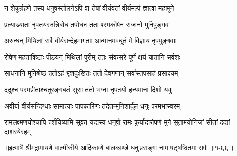 \twolineshloka
{न शेकुर्ग्रहणे तस्य धनुषस्तोलनेऽपि वा}
{तेषां वीर्यवतां वीर्यमल्पं ज्ञात्वा महामुने} %

\twolineshloka
{प्रत्याख्याता नृपतयस्तन्निबोध तपोधन}
{ततः परमकोपेन राजानो मुनिपुङ्गव} %

\twolineshloka
{अरुन्धन् मिथिलां सर्वे वीर्यसन्देहमागताः}
{आत्मानमवधूतं मे विज्ञाय नृपपुङ्गवाः} %

\twolineshloka
{रोषेण महताविष्टाः पीडयन् मिथिलां पुरीम्}
{ततः संवत्सरे पूर्णे क्षयं यातानि सर्वशः} %

\twolineshloka
{साधनानि मुनिश्रेष्ठ ततोऽहं भृशदुःखितः}
{ततो देवगणान् सर्वांस्तपसाहं प्रसादयम्} %

\twolineshloka
{ददुश्च परमप्रीताश्चतुरङ्गबलं सुराः}
{ततो भग्ना नृपतयो हन्यमाना दिशो ययुः} %

\twolineshloka
{अवीर्या वीर्यसन्दिग्धाः सामात्याः पापकारिणः}
{तदेतन्मुनिशार्दूल धनुः परमभास्वरम्} %

\threelineshloka
{रामलक्ष्मणयोश्चापि दर्शयिष्यामि सुव्रत}
{यद्यस्य धनुषो रामः कुर्यादारोपणं मुने}
{सुतामयोनिजां सीतां दद्यां दाशरथेरहम्} %


॥इत्यार्षे श्रीमद्रामायणे वाल्मीकीये आदिकाव्ये बालकाण्डे धनुःप्रसङ्गः नाम षट्षष्ठितमः सर्गः ॥१-६६॥
